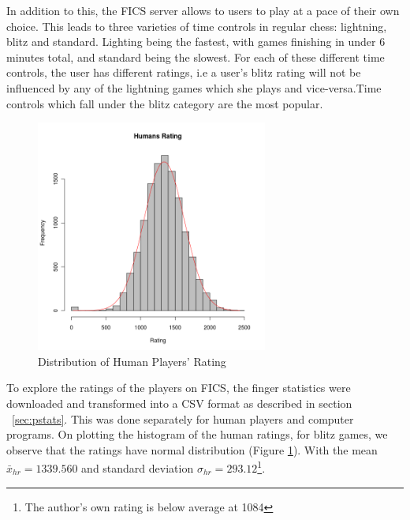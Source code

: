 \documentclass{article}
\begin{document}
In addition to this, the FICS server allows to users to play at a pace of their own choice. This leads to three varieties of time controls in regular chess: lightning, blitz and standard. Lighting being the fastest, with games finishing in under 6 minutes total, and standard being the slowest. For each of these different time controls, the user has different ratings, i.e a user's blitz rating will not be influenced by any of the lightning games which she plays and vice-versa.Time controls which fall under the blitz category are the most popular.\\

\begin{figure} [htp]
\begin{center}
\includegraphics[width=3in]{humans_rating.png}
\end{center}
\caption{Distribution of Human Players' Rating}
\label{fig:humanrating}
\end{figure}


To explore the ratings of the players on FICS, the finger statistics were downloaded and transformed into a CSV format as described in section ~\ref{sec:pstats}. This was done separately for human players and computer programs. On plotting the histogram of the human ratings, for blitz games, we observe that the ratings have normal distribution (Figure \ref{fig:humanrating}). With the mean $\bar{x}_{hr} = 1339.560$ and standard deviation $\sigma_{hr} = 293.12$\footnote{The author's own rating is below average at 1084}.\\
\end{document}

